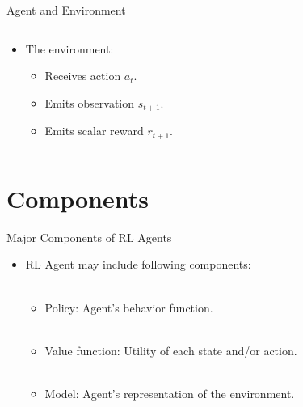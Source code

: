 \documentclass{beamer}
\begin{document}
\begin{frame}{Agent and Environment}
\begin{columns}
\begin{column}{0.5\textwidth}
\begin{itemize}
                \item The environment:
                \begin{itemize}
                    \item Receives action $a_t$.
                    \item Emits observation $s_{t+1}$.
                    \item Emits scalar reward $r_{t+1}$.
                \end{itemize}
            \end{itemize}
        \end{column}
    \end{columns}
\end{frame}

\section{Components}

\begin{frame}{Major Components of RL Agents}
    \begin{itemize}
        \item RL Agent may include following components:\\~
        \begin{itemize}
            \item Policy: Agent's behavior function.\\~
            \item Value function: Utility of each state and/or action.\\~
            \item Model: Agent's representation of the environment.
        \end{itemize}
    \end{itemize}
\end{frame}
\end{document}
